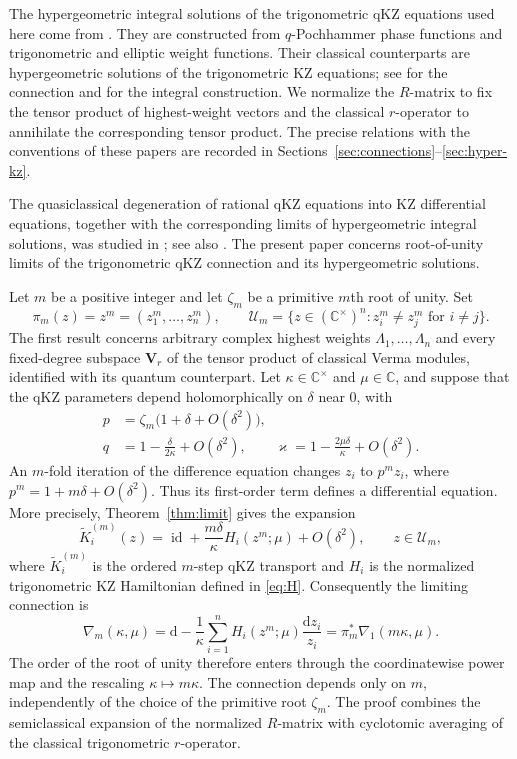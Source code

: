 \documentclass[12pt]{amsart}
\theoremstyle{definition}
\numberwithin{equation}{section}
\theoremstyle{definition}
\let\mc\mathcal
\let\ka\kappa
\let\La\Lambda
\let\on\operatorname
\def\C{{\mathbb C}}
\def\id{\on{id}}
\begin{document}
The hypergeometric integral solutions of the trigonometric qKZ
equations used here come from \cite[Section~5]{TV97}. They are
constructed from $q$-Pochhammer phase functions and trigonometric
and elliptic weight functions. Their classical counterparts are
hypergeometric solutions of the trigonometric KZ equations; see
\cite[Section~2.2]{TV00} for the connection and
\cite[Section~4]{MaV02} for the integral construction. We normalize the $R$-matrix to fix the tensor product of
highest-weight vectors and the classical $r$-operator to
annihilate the corresponding tensor product. The precise
relations with the conventions of these papers are recorded in
Sections~\ref{sec:connections}--\ref{sec:hyper-kz}.

The quasiclassical degeneration of rational qKZ
equations into KZ differential equations, together with
the corresponding limits of hypergeometric integral
solutions, was studied in
\cite[Sections~7--8]{TVInv97};
see also \cite[Appendix~A.1]{MV24}.
The present paper concerns root-of-unity limits of
the trigonometric qKZ connection and its
hypergeometric solutions.

Let $m$ be a positive integer and let $\zeta_m$ be a primitive
$m$th root of unity. Set
\[
 \pi_m(z)=z^m=(z_1^m,\ldots,z_n^m),\qquad
 \mc U_m=\{z\in(\C^\times)^n:z_i^m\ne z_j^m
                                  \text{ for }i\ne j\}.
\]
The first result concerns arbitrary complex highest weights
$\La_1,\ldots,\La_n$ and every fixed-degree subspace
$\mathbf V_r$ of the tensor product of classical Verma modules,
identified with its quantum counterpart. Let
$\ka\in\C^\times$ and $\mu\in\C$, and suppose that the qKZ
parameters depend holomorphically on $\delta$ near $0$, with
\[
 \begin{aligned}
 p&=\zeta_m\bigl(1+\delta+O(\delta^2)\bigr),\\
 q&=1-\frac{\delta}{2\ka}+O(\delta^2),\qquad
 \varkappa=1-\frac{2\mu\delta}{\ka}+O(\delta^2).
 \end{aligned}
\]
An $m$-fold iteration of the difference equation changes $z_i$
to $p^m z_i$, where $p^m=1+m\delta+O(\delta^2)$. Thus its
first-order term defines a differential equation. More precisely,
Theorem~\ref{thm:limit} gives the expansion
\[
 \widetilde K_i^{(m)}(z)
 =\id+\frac{m\delta}{\ka}H_i(z^m;\mu)+O(\delta^2),
 \qquad z\in\mc U_m,
\]
where $\widetilde K_i^{(m)}$ is the ordered $m$-step qKZ
transport and $H_i$ is the normalized trigonometric KZ Hamiltonian
defined in \eqref{eq:H}. Consequently the limiting connection is
\[
 \nabla_m(\ka,\mu)
 =\mathrm{d}-\frac1\ka\sum_{i=1}^n
 H_i(z^m;\mu)\frac{\mathrm{d}z_i}{z_i}
 =\pi_m^*\nabla_1(m\ka,\mu).
\]
The order of the root of unity therefore enters through the
coordinatewise power map and the rescaling $\ka\mapsto m\ka$.
The connection depends only on $m$, independently of the choice
of the primitive root $\zeta_m$. The proof combines the
semiclassical expansion of the normalized $R$-matrix with
cyclotomic averaging of the classical trigonometric $r$-operator.
\end{document}
